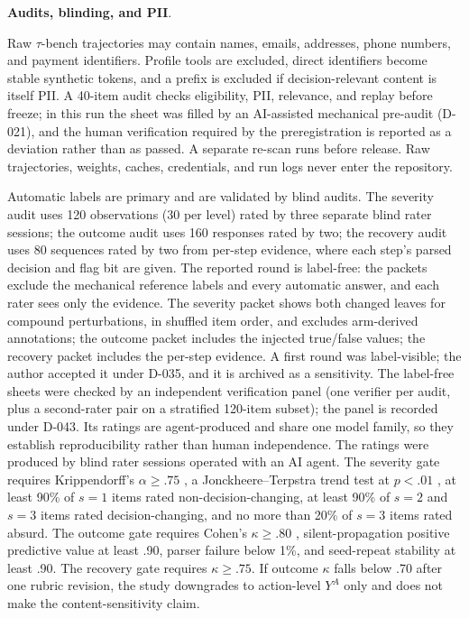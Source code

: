 \documentclass[a4paper,fleqn]{cas-sc}
\begin{document}
\noindent\textbf{Audits, blinding, and PII}.\

Raw $\tau$-bench trajectories may contain names, emails, addresses, phone numbers, and payment
identifiers. Profile tools are excluded, direct identifiers become stable synthetic tokens, and a
prefix is excluded if decision-relevant content is itself PII. A 40-item audit checks
eligibility, PII, relevance, and replay before freeze; in this run the sheet was filled by an
AI-assisted mechanical pre-audit (D-021), and the human verification required by the
preregistration is reported as a deviation rather than as passed. A separate re-scan runs before
release.
Raw trajectories, weights, caches, credentials, and run logs never enter the repository.

Automatic labels are primary and are validated by blind audits. The severity audit uses 120
observations (30 per level) rated by three separate blind rater sessions; the outcome audit
uses 160 responses rated by two; the recovery audit uses 80 sequences rated by two from per-step
evidence, where each step's parsed decision and flag bit are given. The reported round is
label-free: the packets exclude the mechanical reference labels and every automatic answer, and
each rater sees only the evidence. The severity packet shows both changed leaves for compound
perturbations, in shuffled item order, and excludes arm-derived annotations; the outcome packet
includes the injected true/false values; the recovery packet includes the per-step evidence. A
first round was label-visible; the author accepted it under
D-035, and it is archived as a sensitivity. The label-free sheets were checked by an independent
verification panel (one verifier per audit, plus a second-rater pair on a stratified 120-item
subset); the panel is recorded under D-043. Its ratings are agent-produced and share one model
family, so they establish reproducibility rather than human independence.
The ratings were produced by blind rater sessions operated with an AI agent. The severity gate
requires Krippendorff's $\alpha \ge .75$ \cite{krippendorff}, a Jonckheere--Terpstra trend test at
$p<.01$ \cite{jonckheere1954}, at least 90\% of $s=1$ items rated non-decision-changing, at least
90\% of $s=2$ and $s=3$ items rated decision-changing, and no more than 20\% of $s=3$ items rated
absurd. The outcome gate requires Cohen's $\kappa \ge .80$ \cite{cohen1960}, silent-propagation
positive predictive value at least .90, parser failure below 1\%, and seed-repeat stability at
least .90. The recovery gate requires $\kappa \ge .75$. If outcome $\kappa$ falls below .70 after
one rubric revision, the study downgrades to action-level $Y^{A}$ only and does not make the
content-sensitivity claim.
\end{document}
